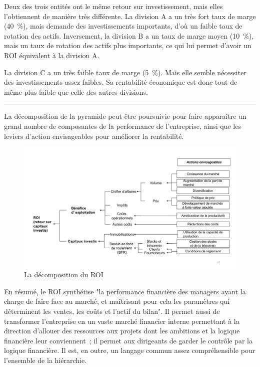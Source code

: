 \documentclass[oneside]{kaobook}
\begin{document}
Deux des trois entités ont le même retour sur investissement, mais elles l'obtiennent de manière très différente. La division A a un très fort taux de marge (40 \%), mais demande des investissements importants, d'où un faible taux de rotation des actifs. Inversement, la division B a un taux de marge moyen (10 \%), mais un taux de rotation des actifs plus importants, ce qui lui permet d'avoir un ROI équivalent à la division A.

La division C a un très faible taux de marge (5 \%). Mais elle semble nécessiter des investissements assez faibles. Sa rentabilité économique est donc tout de même plus faible que celle des autres divisions.

\noindent\rule{\textwidth}{0.5pt}

La décomposition de la pyramide peut être poursuivie pour faire apparaître un grand nombre de composantes de la performance de l'entreprise, ainsi que les leviers d'action envisageables pour améliorer la rentabilité.

\begin{figure}[H]

\includegraphics{./img/roidetail.pdf}
\caption{La décomposition du ROI}
\end{figure}

En résumé, le ROI synthétise "la performance financière des managers ayant la charge de faire face au marché, et maîtrisant pour cela les paramètres qui déterminent les ventes, les coûts et l'actif du bilan". Il permet aussi de transformer l'entreprise en un vaste marché financier interne permettant à la direction d'allouer des ressources aux projets dont les ambitions et la logique financière leur conviennent ; il permet aux dirigeants de garder le contrôle par la logique financière. Il est, en outre, un langage commun assez compréhensible pour l'ensemble de la hiérarchie.
\end{document}
